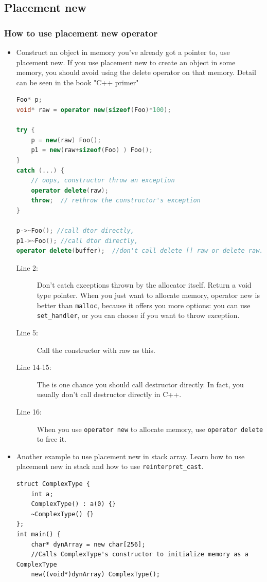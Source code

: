 \documentclass[a4paper,11pt,twoside]{book}
\begin{document}
\subsection{Placement new}
\subsubsection{How to use placement new operator}
\begin{itemize}
	\item Construct an object in memory you've already got a pointer to, use placement new. If you use placement new to create an object in some memory, you should avoid using the delete operator on that memory.  Detail can be seen in the book "C++ primer"
\begin{lstlisting}[frame=single, language=c++]
Foo* p;
void* raw = operator new(sizeof(Foo)*100);
	
try {
	p = new(raw) Foo();  
	p1 = new(raw+sizeof(Foo) ) Foo();
}
catch (...) {
	// oops, constructor throw an exception
	operator delete(raw);
	throw;  // rethrow the constructor's exception
}

p->~Foo(); //call dtor directly,
p1->~Foo(); //call dtor directly,
operator delete(buffer);  //don't call delete [] raw or delete raw.
\end{lstlisting}
\begin{description}
	\item[Line 2:] Don't catch exceptions thrown by the allocator itself. Return a void type pointer. When you just want to allocate memory, operator new is better than \texttt{malloc}, because it offers you more options: you can use \texttt{set\_handler}, or you can choose if you want to throw exception.
		
	\item[Line 5:] Call the constructor with raw as this.
	\item[Line 14-15:] The is one chance you should call destructor directly. In fact, you usually don't call destructor directly in C++.
	 \item[Line 16:] When you use \texttt{operator new} to allocate memory, use \texttt{operator delete} to free it. 
\end{description}
	
	\item Another example to use placement new in stack array. Learn how to use placement new in stack and how to use \texttt{reinterpret\_cast}.
\begin{lstlisting}[numbers=none]
struct ComplexType {
	int a;
	ComplexType() : a(0) {}
	~ComplexType() {}
};
int main() {
	char* dynArray = new char[256];
	//Calls ComplexType's constructor to initialize memory as a ComplexType
	new((void*)dynArray) ComplexType();
	

\end{lstlisting}
\end{itemize}
\end{document}
